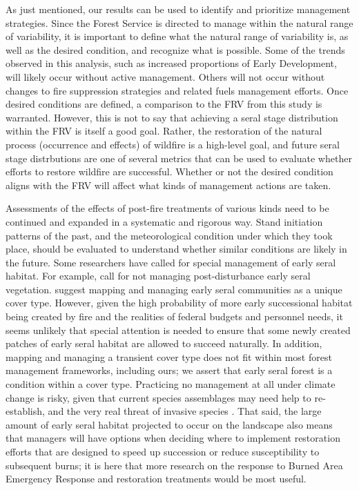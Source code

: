 As just mentioned, our results can be used to identify and prioritize management strategies. Since the Forest Service is directed to manage within the natural range of variability, it is important to define what the natural range of variability is, as well as the desired condition, and recognize what is possible. Some of the trends observed in this analysis, such as increased proportions of Early Development, will likely occur without active management. Others will not occur without changes to fire suppression strategies and related fuels management efforts. Once desired conditions are defined, a comparison to the FRV from this study is warranted. However, this is not to say that achieving a seral stage distribution within the FRV is itself a good goal. Rather, the restoration of the natural process (occurrence and effects) of wildfire is a high-level goal, and future seral stage distrbutions are one of several metrics that can be used to evaluate whether efforts to restore wildfire are successful. Whether or not the desired condition aligns with the FRV will affect what kinds of management actions are taken.

Assessments of the effects of post-fire treatments of various kinds need to be continued and expanded in a systematic and rigorous way. Stand initiation patterns of the past, and the meteorological condition under which they took place, should be evaluated to understand whether similar conditions are likely in the future. Some researchers have called for special management of early seral habitat. For example, \citet{Dellasala2014} call for not managing post-disturbance early seral vegetation. \citet{Swanson2011} suggest mapping and managing early seral communities as a unique cover type. However, given the high probability of more early successional habitat being created by fire and the realities of federal budgets and personnel needs, it seems unlikely that special attention is needed to ensure that some newly created patches of early seral habitat are allowed to succeed naturally. In addition, mapping and managing a transient cover type does not fit within most forest management frameworks, including ours; we assert that early seral forest is a condition within a cover type. Practicing no management at all under climate change is risky, given that current species assemblages may need help to re-establish, and the very real threat of invasive species \citep{Stephens2010}. That said, the large amount of early seral habitat projected to occur on the landscape also means that managers will have options when deciding where to implement restoration efforts that are designed to speed up succession or reduce susceptibility to subsequent burns; it is here that more research on the response to Burned Area Emergency Response and restoration treatments would be most useful.

